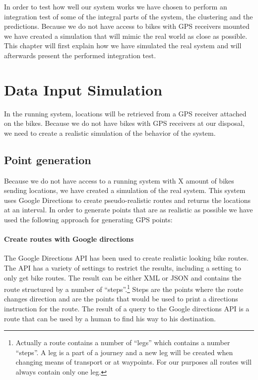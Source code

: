 In order to test how well our system works we have chosen to perform an integration test of some of the integral parts of the system, the clustering and the predictions.
Because we do not have access to bikes with GPS receivers mounted we have created a simulation that will mimic the real world as close as possible.
This chapter will first explain how we have simulated the real system and will afterwards present the performed integration test.

\section{Data Input Simulation}\label{design:datasimulation}
In the running system, locations will be retrieved from a GPS receiver attached on the bikes.
Because we do not have bikes with GPS receivers at our disposal, we need to create a realistic simulation of the behavior of the system.

\subsection{Point generation} \label{inputsimulation:pointgeneration}
Because we do not have access to a running system with X amount of bikes sending locations, we have created a simulation of the real system.
This system uses Google Directions to create pseudo-realistic routes and returns the locations at an interval.
In order to generate points that are as realistic as possible we have used the following approach for generating GPS points:

\paragraph{Create routes with Google directions} The Google Directions API \cite{gdirections} has been used to create realistic looking bike routes.
The API has a variety of settings to restrict the results, including a setting to only get bike routes.
The result can be either XML or JSON and contains the route structured by a number of ``steps''.\footnote{Actually a route contains a number of  ``legs'' which contains a number ``steps''. 
A leg is a part of a journey and a new leg will be created when changing means of transport or at waypoints.
For our purposes all routes will always contain only one leg.}
Steps are the points where the route changes direction and are the points that would be used to print a directions instruction for the route.
The result of a query to the Google directions API is a route that can be used by a human to find his way to his destination.

